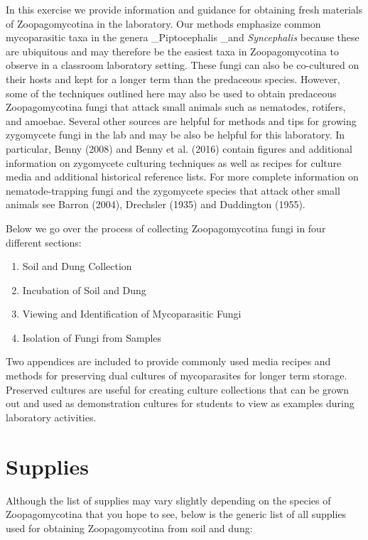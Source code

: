 \documentclass[]{book}
\providecommand{\tightlist}{%
  \setlength{\itemsep}{0pt}\setlength{\parskip}{0pt}}
\begin{document}
In this exercise we provide information and guidance for obtaining fresh
materials of Zoopagomycotina in the laboratory. Our methods emphasize
common mycoparasitic taxa in the genera \_Piptocephalis \_and
\emph{Syncephalis} because these are ubiquitous and may therefore be the
easiest taxa in Zoopagomycotina to observe in a classroom laboratory
setting. These fungi can also be co-cultured on their hosts and kept for
a longer term than the predaceous species. However, some of the
techniques outlined here may also be used to obtain predaceous
Zoopagomycotina fungi that attack small animals such as nematodes,
rotifers, and amoebae. Several other sources are helpful for methods and
tips for growing zygomycete fungi in the lab and may be also be helpful
for this laboratory. In particular, Benny (2008) and Benny et al. (2016)
contain figures and additional information on zygomycete culturing
techniques as well as recipes for culture media and additional
historical reference lists. For more complete information on
nematode-trapping fungi and the zygomycete species that attack other
small animals see Barron (2004), Drechsler (1935) and Duddington (1955).

Below we go over the process of collecting Zoopagomycotina fungi in four
different sections:

\begin{enumerate}
\def\labelenumi{\arabic{enumi}.}
\tightlist
\item
  Soil and Dung Collection
\item
  Incubation of Soil and Dung
\item
  Viewing and Identification of Mycoparasitic Fungi
\item
  Isolation of Fungi from Samples
\end{enumerate}

Two appendices are included to provide commonly used media recipes and
methods for preserving dual cultures of mycoparasites for longer term
storage. Preserved cultures are useful for creating culture collections
that can be grown out and used as demonstration cultures for students to
view as examples during laboratory activities.

\section{Supplies}\label{supplies}

Although the list of supplies may vary slightly depending on the species
of Zoopagomycotina that you hope to see, below is the generic list of
all supplies used for obtaining Zoopagomycotina from soil and dung:
\end{document}
